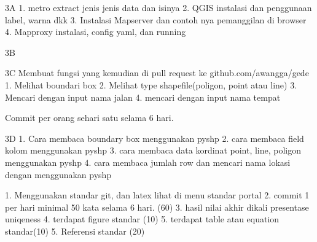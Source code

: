 3A
1. metro extract jenis jenis data dan isinya 
2. QGIS instalasi dan penggunaan label, warna dkk
3. Instalasi Mapserver dan contoh nya pemanggilan di browser
4. Mapproxy instalasi, config yaml, dan running

3B

3C
Membuat fungsi yang kemudian di pull request ke github.com/awangga/gede
1. Melihat boundari box
2. Melihat type shapefile(poligon, point atau line)
3. Mencari dengan input nama jalan
4. mencari dengan input nama tempat

Commit per orang sehari satu selama 6 hari.

3D
1. Cara membaca boundary box menggunakan pyshp
2. cara membaca field kolom menggunakan pyshp
3. cara membaca data kordinat point, line, poligon menggunakan pyshp
4. cara membaca jumlah row dan mencari nama lokasi dengan menggunakan pyshp



1. Menggunakan standar git, dan latex lihat di menu standar portal
2. commit 1 per hari minimal 50 kata selama 6 hari. (60)
3. hasil nilai akhir dikali presentase uniqeness
4. terdapat figure standar (10)
5. terdapat table atau equation standar(10)
5. Referensi standar (20)